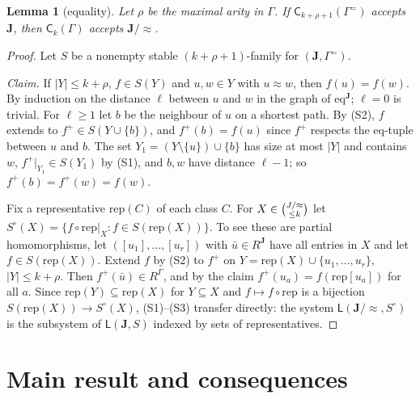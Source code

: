 \documentclass[11pt]{article}
\newtheorem{lemma}[theorem]{Lemma}
\theoremstyle{definition}
\theoremstyle{remark}
\newcommand{\Coh}{\mathsf{C}}
\newcommand{\eqrel}{\mathrm{eq}}
\newcommand{\sub}[2]{\tbinom{#1}{\le #2}}
\begin{document}
\begin{lemma}[equality]\label{lem:eq}
Let $\rho$ be the maximal arity in $\Gamma$. If
$\Coh_{k+\rho+1}(\Gamma^{=})$ accepts $\mathbf J$, then $\Coh_k(\Gamma)$
accepts $\mathbf J/{\approx}$.
\end{lemma}
\begin{proof}
Let $S$ be a nonempty stable $(k+\rho+1)$-family for $(\mathbf J,\Gamma^=)$.

\emph{Claim.} If $|Y|\le k+\rho$, $f\in S(Y)$ and $u,w\in Y$ with
$u\approx w$, then $f(u)=f(w)$. By induction on the distance $\ell$ between
$u$ and $w$ in the graph of $\eqrel^{\mathbf J}$; $\ell=0$ is trivial. For
$\ell\ge1$ let $b$ be the neighbour of $u$ on a shortest path. By (S2), $f$
extends to $f^+\in S(Y\cup\{b\})$, and $f^+(b)=f(u)$ since $f^+$ respects the
$\eqrel$-tuple between $u$ and $b$. The set $Y_1=(Y\setminus\{u\})\cup\{b\}$
has size at most $|Y|$ and contains $w$, $f^+|_{Y_1}\in S(Y_1)$ by (S1), and
$b,w$ have distance $\ell-1$; so $f^+(b)=f^+(w)=f(w)$.

Fix a representative $\mathrm{rep}(C)$ of each class $C$. For
$X\in\sub{J/\approx}{k}$ let
$S^\circ(X)=\{f\circ\mathrm{rep}|_X: f\in S(\mathrm{rep}(X))\}$. To see these
are partial homomorphisms, let $([u_1],\dots,[u_r])$ with $\bar u\in
R^{\mathbf J}$ have all entries in $X$ and let $f\in S(\mathrm{rep}(X))$.
Extend $f$ by (S2) to $f^+$ on $Y=\mathrm{rep}(X)\cup\{u_1,\dots,u_r\}$,
$|Y|\le k+\rho$. Then $f^+(\bar u)\in R^\Gamma$, and by the claim
$f^+(u_a)=f(\mathrm{rep}[u_a])$ for all $a$. Since
$\mathrm{rep}(Y)\subseteq\mathrm{rep}(X)$ for $Y\subseteq X$ and
$f\mapsto f\circ\mathrm{rep}$ is a bijection
$S(\mathrm{rep}(X))\to S^\circ(X)$, (S1)--(S3) transfer directly: the system
$\mathsf L(\mathbf J/{\approx},S^\circ)$ is the subsystem of
$\mathsf L(\mathbf J,S)$ indexed by sets of representatives.
\end{proof}

\section{Main result and consequences}
\end{document}
